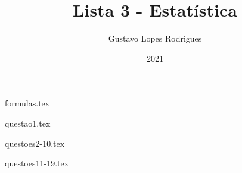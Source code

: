 \documentclass[12pt]{article}
\title{\textbf{Lista 3 - Estatística}}
\author{Gustavo Lopes Rodrigues}
\date{2021}
\begin{document}
    
    \maketitle

    {formulas.tex}

    \newpage

    {questao1.tex}

    {questoes2-10.tex}

    {questoes11-19.tex}
\end{document}
